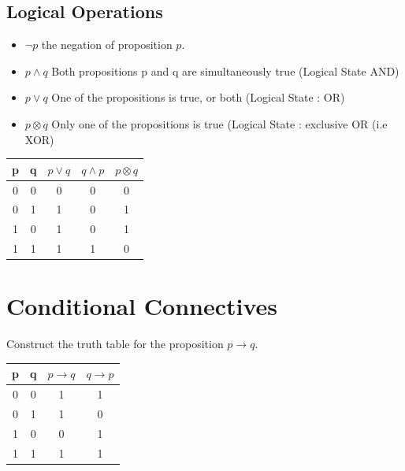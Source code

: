 \documentclass[]{report}
\begin{document}
\subsection{Logical Operations}
\begin{itemize}
\item $\neg p$ the negation of proposition $p$.
\item $p \wedge q$ Both propositions p and q are simultaneously true (Logical State AND)
\item $p \vee q $ One of the propositions is true, or both (Logical State : OR)
\item $p \otimes q$ Only one of the propositions is true (Logical State : exclusive OR (i.e XOR)
\end{itemize}
\begin{center}
\begin{tabular}{|c|c|c|c|c|}
\hline
p & q & $p \vee q$ & $q \wedge p$ & $p \otimes q$ \\
\hline
0 & 0 & 0 & 0 & 0 \\
0 & 1 & 1 & 0 & 1\\
1 & 0 & 1 & 0 & 1 \\
1 & 1 & 1 & 1 & 0\\
\hline
\end{tabular}
\end{center}
\section{Conditional Connectives}
Construct the truth table for the proposition $p \rightarrow q$.

\begin{center}
\begin{tabular}{|c|c|c|c|}
\hline
p & q & $p \rightarrow q$ & $q \rightarrow p$ \\
\hline
0 & 0 & 1& 1 \\
0 & 1 & 1 & 0 \\
1 & 0 & 0 & 1 \\
1 & 1 & 1 & 1 \\
\hline
\end{tabular}
\end{center}

\end{document}

